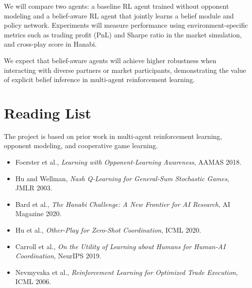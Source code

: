 \documentclass[11pt]{article}
\begin{document}
We will compare two agents: a baseline RL agent trained without opponent modeling and a belief-aware RL agent that jointly learns a belief module and policy network. Experiments will measure performance using environment-specific metrics such as trading profit (PnL) and Sharpe ratio in the market simulation, and cross-play score in Hanabi. 

We expect that belief-aware agents will achieve higher robustness when interacting with diverse partners or market participants, demonstrating the value of explicit belief inference in multi-agent reinforcement learning.

\section*{Reading List}

The project is based on prior work in multi-agent reinforcement learning, opponent modeling, and cooperative game learning.

\begin{itemize}[leftmargin=*]
\item Foerster et al., \textit{Learning with Opponent-Learning Awareness}, AAMAS 2018.
\item Hu and Wellman, \textit{Nash Q-Learning for General-Sum Stochastic Games}, JMLR 2003.
\item Bard et al., \textit{The Hanabi Challenge: A New Frontier for AI Research}, AI Magazine 2020.
\item Hu et al., \textit{Other-Play for Zero-Shot Coordination}, ICML 2020.
\item Carroll et al., \textit{On the Utility of Learning about Humans for Human-AI Coordination}, NeurIPS 2019.
\item Nevmyvaka et al., \textit{Reinforcement Learning for Optimized Trade Execution}, ICML 2006.
\end{itemize}
\end{document}
